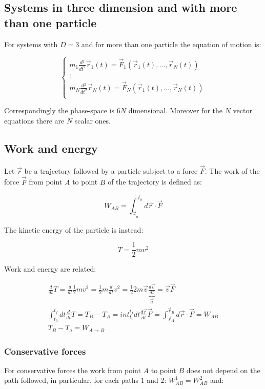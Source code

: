   \subsection{Systems in three dimension and with more than one particle}
  For systems with $D=3$ and for more than one particle the equation of motion is:

  $$\begin{cases}
    m_1 \frac{d{^2}}{d{t^2}}\vec{r}_1(t) = \vec{F}_1(\vec{r}_1(t), \dots,\vec{r}_N(t))\\
    \vdots\\
    m_N \frac{d{^2}}{d{t^2}}\vec{r}_N(t) = \vec{F}_N(\vec{r}_1(t), \dots,\vec{r}_N(t))\\
  \end{cases}$$

  Correspondingly the phase-space is $6N$ dimensional.
  Moreover for the $N$ vector equations there are $N$ scalar ones.

  \subsection{Work and energy}
  Let $\vec{r}$ be a trajectory followed by a particle subject to a force $\vec{F}$.
  The work of the force $\vec{F}$ from point $A$ to point $B$ of the trajectory is defined as:

  $$W_{AB} = \int_{\vec{r}_a}^{\vec{r}_b}d \vec{r}\cdot \vec{F}$$

  The kinetic energy of the particle is instead:

  $$T = \frac{1}{2}mv^2$$

  Work and energy are related:

  \begin{align*}
    \frac{d{}}{d{t}}T = \frac{d{}}{d{t}}\frac{1}{2}mv^2 = \frac{1}{2}m \frac{d{}}{d{t}}v^2 = \frac{1}{2}2m \vec{v}\underbrace{\frac{d{\vec{v}}}{d{t}}}_{\vec{a}} = \vec{v} \vec{F}\\
    \int_{t_0}^{t_f}dt \frac{d{}}{d{t}}T = T_B-T_A = int_{t_i}^{t_f}dt \frac{d{\vec{r}}}{d{t}}\vec{F} = \int_{\vec{r}_A}^{\vec{r}_B} d \vec{r}\cdot \vec{F} = W_{AB}\\
    T_B-T_a = W_{A\rightarrow B}
  \end{align*}

    \subsubsection{Conservative forces}
    For conservative forces the work from point $A$ to point $B$ does not depend on the path followed, in particular, for each paths $1$ and $2$: $W_{AB}^1 = W_{AB}^2$ and:


